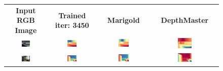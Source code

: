 \documentclass{article}
\begin{document}
\begin{figure}[H]
  \centering
  \begin{tabular}{cccc}
    \textbf{Input RGB Image} & \textbf{Trained iter: 3450} & \textbf{Marigold} & \textbf{DepthMaster} \\
    \includegraphics[width=0.22\textwidth]{images/test-image/inside-01.jpg} &
    \includegraphics[width=0.22\textwidth]{images/trained/inside-01_pred_colored.png} &
    \includegraphics[width=0.22\textwidth]{images/pretrained/inside-01_pred_colored.png} &
    \includegraphics[width=0.22\textwidth]{images/depthmaster/inside-01_pred_colored.jpg} \\

    \includegraphics[width=0.22\textwidth]{images/test-image/synthetic-inside-01.jpg} &
    \includegraphics[width=0.22\textwidth]{images/trained/synthetic-inside-01_pred_colored.png} &
    \includegraphics[width=0.22\textwidth]{images/pretrained/synthetic-inside-01_pred_colored.png} &
    \includegraphics[width=0.22\textwidth]{images/depthmaster/synthetic-inside-01_pred_colored.jpg} \\


\end{tabular}
\end{figure}
\end{document}
